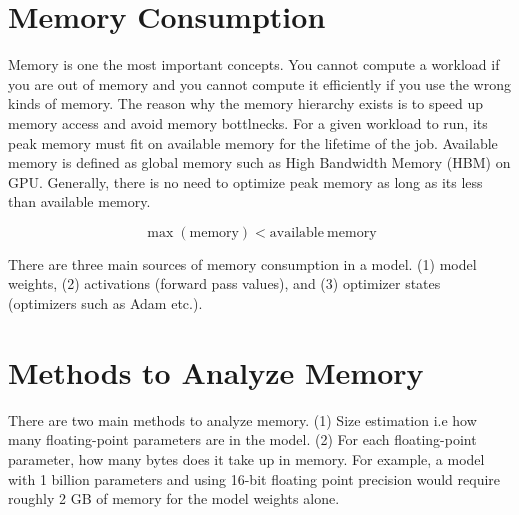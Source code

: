 \section{Memory Consumption}
Memory is one the most important concepts.  You cannot compute a workload if you are out of memory and you cannot compute it efficiently if you use the wrong kinds of memory.  The reason why the memory hierarchy exists is to speed up memory access and avoid memory bottlnecks. For a given workload to run, its peak memory must fit on available memory for the lifetime of the job. Available memory is defined as global memory such as High Bandwidth Memory (HBM) on GPU. Generally, there is no need to optimize peak memory as long as its less than available memory. 

$$ \max(\mathrm{memory}) < \mathrm{available\ memory} $$

There are three main sources of memory consumption in a model. (1) model weights, (2) activations (forward pass values), and (3) optimizer states (optimizers such as Adam etc.).


\section{Methods to Analyze Memory}
There are two main methods to analyze memory. (1) Size estimation i.e how many floating-point parameters are in the model. (2) For each floating-point parameter, how many bytes does it take up in memory.  For example, a model with 1 billion parameters and using 16-bit floating point precision would require roughly 2 GB of memory for the model weights alone.